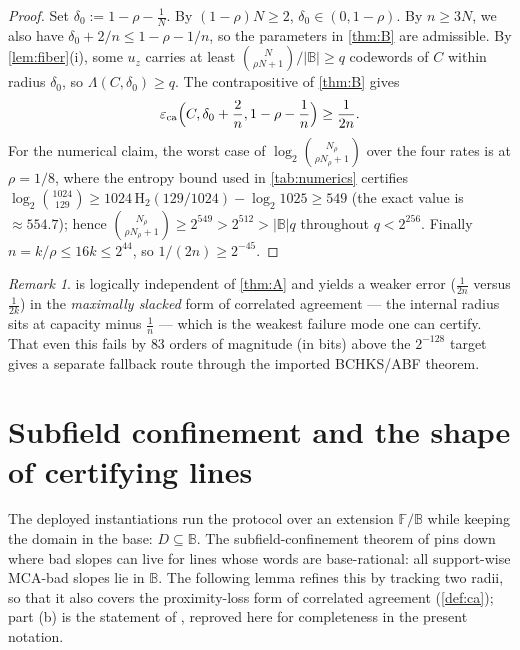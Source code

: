 \documentclass[11pt]{article}
\theoremstyle{definition}
\theoremstyle{remark}
\newtheorem{remark}[remark]{Remark}
\newcommand{\F}{\mathbb{F}}
\newcommand{\B}{\mathbb{B}}
\newcommand{\eca}{\varepsilon_{\mathrm{ca}}}
\newcommand{\Lst}{\Lambda}
\newcommand{\Hb}{\mathrm{H}_2}
\begin{document}
\begin{proof}
Set $\delta_0:=1-\rho-\frac1N$. By $(1-\rho)N\ge2$, $\delta_0\in(0,1-\rho)$. By $n\ge3N$, we also have $\delta_0+2/n\le1-\rho-1/n$, so the parameters in \cref{thm:B} are admissible. By \cref{lem:fiber}(i), some $u_z$ carries at least $\binom N{\rho N+1}/|\B|\ge q$ codewords of $C$ within radius $\delta_0$, so $\Lst(C,\delta_0)\ge q$. The contrapositive of \cref{thm:B} gives
\[
\eca\Bigl(C,\delta_0+\frac2n,1-\rho-\frac1n\Bigr)\ge\frac1{2n}.
\]
For the numerical claim, the worst case of $\log_2\binom{N_\rho}{\rho N_\rho+1}$ over the four rates is at $\rho=1/8$, where the entropy bound used in \cref{tab:numerics} certifies $\log_2\binom{1024}{129}\ge1024\,\Hb(129/1024)-\log_2 1025\ge549$ (the exact value is $\approx554.7$); hence $\binom{N_\rho}{\rho N_\rho+1}\ge2^{549}>2^{512}>|\B|q$ throughout $q<2^{256}$. Finally $n=k/\rho\le16k\le2^{44}$, so $1/(2n)\ge2^{-45}$.
\end{proof}

\begin{remark}
 is logically independent of \cref{thm:A} and yields a weaker error ($\frac1{2n}$ versus $\frac1{2k}$) in the \emph{maximally slacked} form of correlated agreement --- the internal radius sits at capacity minus $\frac1n$ --- which is the weakest failure mode one can certify. That even this fails by $83$ orders of magnitude (in bits) above the $2^{-128}$ target gives a separate fallback route through the imported BCHKS/ABF theorem.
\end{remark}

\section{Subfield confinement and the shape of certifying lines}\label{sec:subfield}

The deployed instantiations run the protocol over an extension $\F/\B$ while keeping the domain in the base: $D\subseteq\B$. The subfield-confinement theorem of \cite[Thm.\ ``Subfield confinement'']{Cho26b} pins down where bad slopes can live for lines whose words are base-rational: all support-wise MCA-bad slopes lie in $\B$. The following lemma refines this by tracking two radii, so that it also covers the proximity-loss form of correlated agreement (\cref{def:ca}); part (b) is the statement of \cite{Cho26b}, reproved here for completeness in the present notation.
\end{document}
